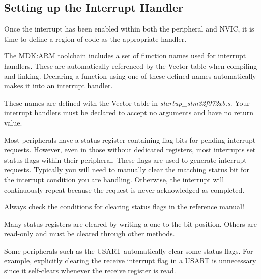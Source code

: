 \documentclass[11pt,fleqn]{book} %
\begin{document}
\subsection{Setting up the Interrupt Handler}  \label{handler_setup}
Once the interrupt has been enabled within both the peripheral and NVIC, it is time to define a region of code as the appropriate handler. 

The MDK:ARM toolchain includes a set of function names used for interrupt handlers. These are automatically referenced by the Vector table when compiling and linking. Declaring a function using one of these defined names automatically makes it into an interrupt handler.

These names are defined with the Vector table in \textit{startup\_stm32f072xb.s}. Your interrupt handlers must be declared to accept no arguments and have no return value. 

Most peripherals have a status register containing flag bits for pending interrupt requests. However, even in those without dedicated registers, most interrupts set status flags within their peripheral. These flags are used to generate interrupt requests. Typically you will need to manually clear the matching status bit for the interrupt condition you are handling. Otherwise, the interrupt will continuously repeat because the request is never acknowledged as completed. 

\begin{warning}
    Always check the conditions for clearing status flags in the reference manual!
    
    Many status registers are cleared by writing a one to the bit position. Others are read-only and must be cleared through other methods. 
    
    Some peripherals such as the USART automatically clear some status flags. For example, explicitly clearing the receive interrupt flag in a USART is unnecessary since it self-clears whenever the receive register is read. 
\end{warning}
\end{document}
